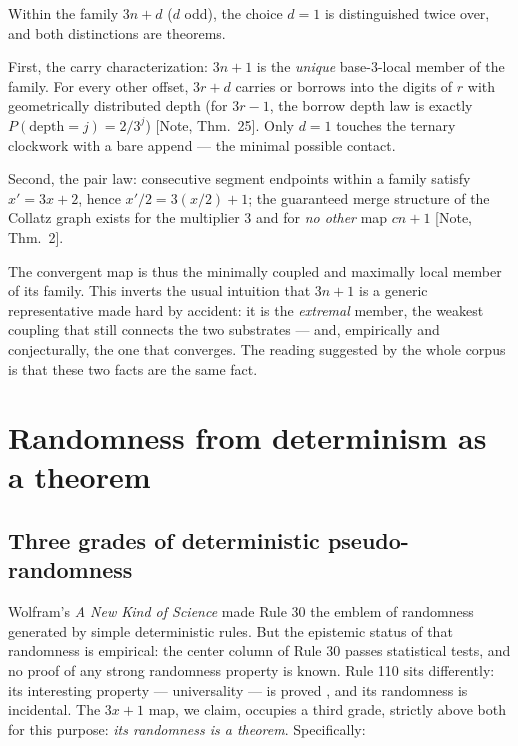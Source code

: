 \documentclass[11pt]{article}
\theoremstyle{definition}
\theoremstyle{remark}
\newcommand{\anchor}[1]{\textup{[#1]}}
\begin{document}
Within the family $3n+d$ ($d$ odd), the choice $d=1$ is distinguished twice
over, and both distinctions are theorems.

First, the carry characterization: $3n+1$ is the \emph{unique} base-$3$-local
member of the family. For every other offset, $3r+d$ carries or borrows into
the digits of $r$ with geometrically distributed depth (for $3r-1$, the borrow
depth law is exactly $P(\text{depth}=j) = 2/3^j$) \anchor{Note, Thm.~25}. Only
$d=1$ touches the ternary clockwork with a bare append --- the minimal
possible contact.

Second, the pair law: consecutive segment endpoints within a family satisfy
$x' = 3x+2$, hence $x'/2 = 3(x/2)+1$; the guaranteed merge structure of the
Collatz graph exists for the multiplier $3$ and for \emph{no other} map $cn+1$
\anchor{Note, Thm.~2}.

The convergent map is thus the minimally coupled and maximally local member of
its family. This inverts the usual intuition that $3n+1$ is a generic
representative made hard by accident: it is the \emph{extremal} member, the
weakest coupling that still connects the two substrates --- and, empirically
and conjecturally, the one that converges. The reading suggested by the whole
corpus is that these two facts are the same fact.

\section{Randomness from determinism as a theorem}
\label{sec:randomness}

\subsection{Three grades of deterministic pseudo-randomness}

Wolfram's \emph{A New Kind of Science} \cite{Wolfram2002} made Rule 30 the
emblem of randomness generated by simple deterministic rules. But the epistemic
status of that randomness is empirical: the center column of Rule 30 passes
statistical tests, and no proof of any strong randomness property is known.
Rule 110 sits differently: its interesting property --- universality --- is
proved \cite{Cook2004}, and its randomness is incidental. The $3x+1$ map, we
claim, occupies a third grade, strictly above both for this purpose:
\emph{its randomness is a theorem}. Specifically:
\end{document}
